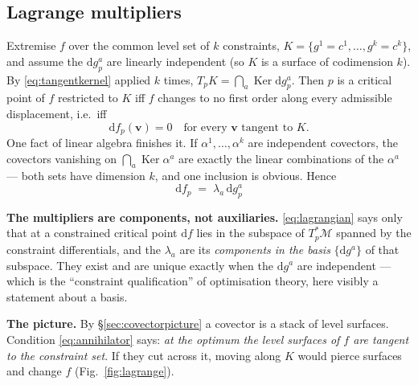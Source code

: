 \documentclass[10pt,a4paper]{article}
\newcommand{\dd}{\mathrm{d}}
\newcommand{\M}{\mathcal{M}}
\newcommand{\vv}{\mathbf{v}}
\newcommand{\Ker}{\operatorname{Ker}}
\theoremstyle{plain}
\theoremstyle{definition}
\numberwithin{equation}{section}
\begin{document}
\subsection{Lagrange multipliers}
\label{sec:lagrange}

Extremise $f$ over the common level set of $k$ constraints,
$K=\{g^1=c^1,\dots,g^k=c^k\}$, and assume the $\dd g^a_p$ are linearly independent (so $K$ is a
surface of codimension $k$). By \eqref{eq:tangentkernel} applied $k$ times,
$T_pK=\bigcap_a\Ker\dd g^a_p$. Then $p$ is a critical point of $f$ restricted to $K$ iff $f$
changes to no first order along every admissible displacement, i.e.\ iff
\begin{equation}
\dd f_p(\vv)=0 \quad\text{for every }\vv\text{ tangent to }K .
\label{eq:annihilator}
\end{equation}
One fact of linear algebra finishes it. If $\alpha^1,\dots,\alpha^k$ are independent covectors,
the covectors vanishing on $\bigcap_a\Ker\alpha^a$ are exactly the linear combinations of the
$\alpha^a$ --- both sets have dimension $k$, and one inclusion is obvious. Hence
\begin{equation}
\boxed{\ \dd f_p\;=\;\lambda_a\,\dd g^a_p\ }
\label{eq:lagrangian}
\end{equation}

\begin{keybox}
\textbf{The multipliers are components, not auxiliaries.} \eqref{eq:lagrangian} says only that
at a constrained critical point $\dd f$ lies in the subspace of $T_p^*\M$ spanned by the
constraint differentials, and the $\lambda_a$ are its \emph{components in the basis}
$\{\dd g^a\}$ of that subspace. They exist and are unique exactly when the $\dd g^a$ are
independent --- which is the ``constraint qualification'' of optimisation theory, here visibly
a statement about a basis.
\end{keybox}

\noindent \textbf{The picture.} By \S\ref{sec:covectorpicture} a covector is a stack of level
surfaces. Condition \eqref{eq:annihilator} says: \emph{at the optimum the level surfaces of $f$
are tangent to the constraint set}. If they cut across it, moving along $K$ would pierce
surfaces and change $f$ (Fig.~\ref{fig:lagrange}).
\end{document}
